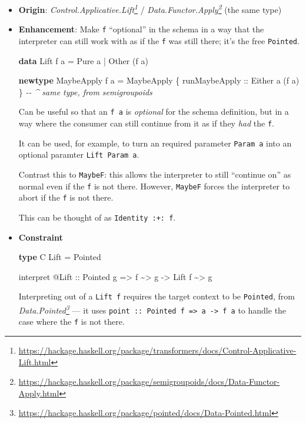 \documentclass[]{article}
\newenvironment{Shaded}{}{}
\newcommand{\CommentTok}[1]{\textcolor[rgb]{0.38,0.63,0.69}{\textit{#1}}}
\newcommand{\DataTypeTok}[1]{\textcolor[rgb]{0.56,0.13,0.00}{#1}}
\newcommand{\KeywordTok}[1]{\textcolor[rgb]{0.00,0.44,0.13}{\textbf{#1}}}
\newcommand{\NormalTok}[1]{#1}
\newcommand{\OperatorTok}[1]{\textcolor[rgb]{0.40,0.40,0.40}{#1}}
\newcommand{\OtherTok}[1]{\textcolor[rgb]{0.00,0.44,0.13}{#1}}
\renewcommand{\href}[2]{#2\footnote{\url{#1}}}
\begin{document}
\begin{itemize}
\item
  \textbf{Origin}:
  \emph{\href{https://hackage.haskell.org/package/transformers/docs/Control-Applicative-Lift.html}{Control.Applicative.Lift}}
  /
  \emph{\href{https://hackage.haskell.org/package/semigroupoids/docs/Data-Functor-Apply.html}{Data.Functor.Apply}}
  (the same type)
\item
  \textbf{Enhancement}: Make \texttt{f} ``optional'' in the schema in a way that
  the interpreter can still work with as if the \texttt{f} was still there; it's
  the free \texttt{Pointed}.

\begin{Shaded}
\begin{Highlighting}[]
\KeywordTok{data} \DataTypeTok{Lift}\NormalTok{ f a }\OtherTok{=} \DataTypeTok{Pure}\NormalTok{  a}
              \OperatorTok{|} \DataTypeTok{Other}\NormalTok{ (f a)}

\KeywordTok{newtype} \DataTypeTok{MaybeApply}\NormalTok{ f a }\OtherTok{=} \DataTypeTok{MaybeApply}\NormalTok{ \{}\OtherTok{ runMaybeApply ::} \DataTypeTok{Either}\NormalTok{ a (f a) \}}
    \CommentTok{{-}{-} \^{} same type, from semigroupoids}
\end{Highlighting}
\end{Shaded}

  Can be useful so that an \texttt{f\ a} is \emph{optional} for the schema
  definition, but in a way where the consumer can still continue from it as if
  they \emph{had} the \texttt{f}.

  It can be used, for example, to turn an required parameter \texttt{Param\ a}
  into an optional paramter \texttt{Lift\ Param\ a}.

  Contrast this to \texttt{MaybeF}: this allows the interpreter to still
  ``continue on'' as normal even if the \texttt{f} is not there. However,
  \texttt{MaybeF} forces the interpreter to abort if the \texttt{f} is not
  there.

  This can be thought of as \texttt{Identity\ :+:\ f}.
\item
  \textbf{Constraint}

\begin{Shaded}
\begin{Highlighting}[]
\KeywordTok{type} \DataTypeTok{C} \DataTypeTok{Lift} \OtherTok{=} \DataTypeTok{Pointed}

\NormalTok{interpret }\OperatorTok{@}\DataTypeTok{Lift}
\OtherTok{    ::} \DataTypeTok{Pointed}\NormalTok{ g}
    \OtherTok{=>}\NormalTok{ f }\OperatorTok{\textasciitilde{}>}\NormalTok{ g}
    \OtherTok{{-}>} \DataTypeTok{Lift}\NormalTok{ f }\OperatorTok{\textasciitilde{}>}\NormalTok{ g}
\end{Highlighting}
\end{Shaded}

  Interpreting out of a \texttt{Lift\ f} requires the target context to be
  \texttt{Pointed}, from
  \emph{\href{https://hackage.haskell.org/package/pointed/docs/Data-Pointed.html}{Data.Pointed}}
  --- it uses
  \texttt{point\ ::\ Pointed\ f\ =\textgreater{}\ a\ -\textgreater{}\ f\ a} to
  handle the case where the \texttt{f} is not there.
\end{itemize}
\end{document}
